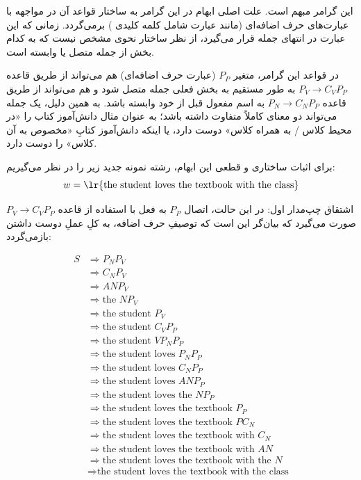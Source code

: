 این گرامر {مبهم} است. علت اصلی ابهام در این گرامر به ساختار قواعد آن در مواجهه با عبارت‌های حرف اضافه‌ای (مانند عبارت شامل کلمه کلیدی ) برمی‌گردد. زمانی که این عبارت در انتهای جمله قرار می‌گیرد، از نظر ساختار نحوی مشخص نیست که به کدام بخش از جمله متصل یا وابسته است.

در قواعد این گرامر، متغیر $P_P$ (عبارت حرف اضافه‌ای) هم می‌تواند از طریق قاعده $P_V \rightarrow C_V P_P$ به طور مستقیم به بخش فعلی جمله متصل شود و هم می‌تواند از طریق قاعده $P_N \rightarrow C_N P_P$ به اسم مفعول قبل از خود وابسته باشد. به همین دلیل، یک جمله می‌تواند دو معنای کاملاً متفاوت داشته باشد؛ به عنوان مثال دانش‌آموز کتاب را «در محیط کلاس / به همراه کلاس» دوست دارد، یا اینکه دانش‌آموز کتابِ «مخصوص به آن کلاس» را دوست دارد.

برای اثبات ساختاری و قطعی این ابهام، رشته نمونه جدید زیر را در نظر می‌گیریم:
\[ w = \text{\lr{the student loves the textbook with the class}} \]

اشتقاق چپ‌مدار اول:
در این حالت، اتصال $P_P$ به فعل با استفاده از قاعده $P_V \rightarrow C_V P_P$ صورت می‌گیرد که بیان‌گر این است که توصیفِ حرف اضافه، به کلِ عملِ دوست داشتن بازمی‌گردد:

\begin{latin}
\begin{align*}
S & \Rightarrow P_N P_V \\
  & \Rightarrow C_N P_V \\
  & \Rightarrow A N P_V \\
  & \Rightarrow \text{the } N P_V \\
  & \Rightarrow \text{the student } P_V \\
  & \Rightarrow \text{the student } C_V P_P \\
  & \Rightarrow \text{the student } V P_N P_P \\
  & \Rightarrow \text{the student loves } P_N P_P \\
  & \Rightarrow \text{the student loves } C_N P_P \\
  & \Rightarrow \text{the student loves } A N P_P \\
  & \Rightarrow \text{the student loves the } N P_P \\
  & \Rightarrow \text{the student loves the textbook } P_P \\
  & \Rightarrow \text{the student loves the textbook } P C_N \\
  & \Rightarrow \text{the student loves the textbook with } C_N \\
  & \Rightarrow \text{the student loves the textbook with } A N \\
  & \Rightarrow \text{the student loves the textbook with the } N \\
  & \Rightarrow \text{the student loves the textbook with the class}
\end{align*}
\end{latin}

